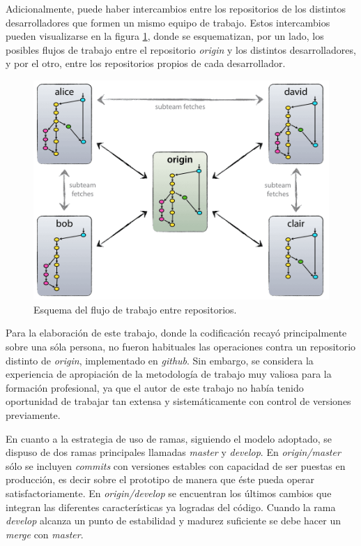 Adicionalmente, puede haber intercambios entre los repositorios de los distintos desarrolladores que formen un mismo equipo de trabajo. Estos intercambios pueden visualizarse en la figura \ref{fig:esquema-repos}, donde se esquematizan, por un lado, los posibles flujos de trabajo entre el repositorio \textit{origin} y los distintos desarrolladores, y por el otro, entre los repositorios propios de cada desarrollador. 

\begin{figure}[ht]
	\centering
	\includegraphics[width=.6\textwidth]{./Figures/centr-decentr@2x.png}
	\caption[Esquema del flujo de trabajo entre repositorios]{Esquema del flujo de trabajo entre repositorios\protect\footnotemark.}
	\label{fig:esquema-repos}
\end{figure}


Para la elaboración de este trabajo, donde la codificación recayó principalmente sobre una sóla persona, no fueron habituales las operaciones contra un repositorio distinto de \textit{origin}, implementado en \textit{github}. Sin embargo, se considera la experiencia de apropiación de la metodología de trabajo muy valiosa para la formación profesional, ya que el autor de este trabajo no había tenido oportunidad de trabajar tan extensa y sistemáticamente con control de versiones previamente.

En cuanto a la estrategia de uso de ramas, siguiendo el modelo adoptado, se dispuso de dos ramas principales llamadas \textit{master} y \textit{develop}.  En \textit{origin/master} sólo se incluyen \textit{commits} con versiones estables con capacidad de ser puestas en producción, es decir sobre el prototipo de manera que éste pueda operar satisfactoriamente.  En \textit{origin/develop} se encuentran  los últimos cambios que integran las diferentes características ya logradas del código.  Cuando la rama \textit{develop} alcanza un punto de estabilidad y madurez suficiente se debe hacer un \textit{merge} con \textit{master}.%

